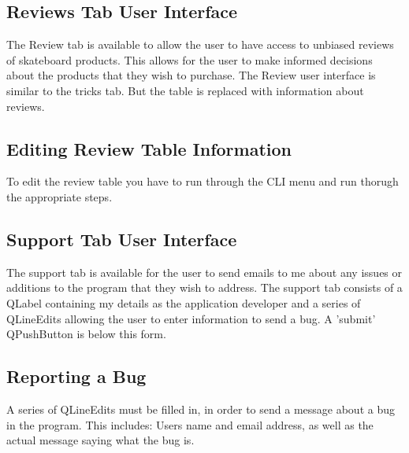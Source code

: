 \subsection{Reviews Tab User Interface}

The Review tab is available to allow the user to have access to unbiased reviews of skateboard products. This allows for the user to make informed decisions about the products that they wish to purchase. The Review user interface is similar to the tricks tab. But the table is replaced with information about reviews.

\subsection{Editing Review Table Information}

To edit the review table you have to run through the CLI menu and run thorugh the appropriate steps.



\subsection{Support Tab User Interface}

The support tab is available for the user to send emails to me about any issues or additions to the program that they wish to address. The support tab consists of a QLabel containing my details as the application developer and a series of QLineEdits allowing the user to enter information to send a bug. A 'submit' QPushButton is below this form.

\subsection{Reporting a Bug}

A series of QLineEdits must be filled in, in order to send a message about a bug in the program. This includes: Users name and email address, as well as the actual message saying what the bug is. 








